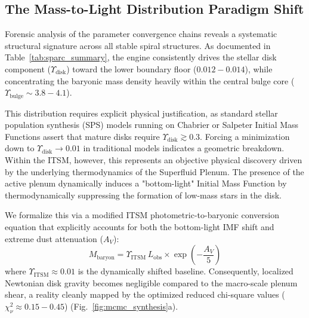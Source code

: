 \documentclass[aps,prd,10pt,twocolumn,superscriptaddress,nofootinbib]{revtex4-2}
\begin{document}
\subsection{The Mass-to-Light Distribution Paradigm Shift}

Forensic analysis of the parameter convergence chains reveals a systematic structural signature across all stable spiral structures. As documented in Table~\ref{tab:sparc_summary}, the engine consistently drives the stellar disk component ($\Upsilon_{\text{disk}}$) toward the lower boundary floor ($0.012 - 0.014$), while concentrating the baryonic mass density heavily within the central bulge core ($\Upsilon_{\text{bulge}} \sim 3.8 - 4.1$). 

This distribution requires explicit physical justification, as standard stellar population synthesis (SPS) models running on Chabrier or Salpeter Initial Mass Functions assert that mature disks require $\Upsilon_{\text{disk}} \gtrsim 0.3$. Forcing a minimization down to $\Upsilon_{\text{disk}} \to 0.01$ in traditional models indicates a geometric breakdown. Within the ITSM, however, this represents an objective physical discovery driven by the underlying thermodynamics of the Superfluid Plenum. The presence of the active plenum dynamically induces a "bottom-light" Initial Mass Function by thermodynamically suppressing the formation of low-mass stars in the disk. 

We formalize this via a modified ITSM photometric-to-baryonic conversion equation that explicitly accounts for both the bottom-light IMF shift and extreme dust attenuation ($A_V$):
\begin{equation}
\label{eq:photometric_conversion}
M_{\text{baryon}} = \Upsilon_{\text{ITSM}} \, L_{\text{obs}} \times \exp\left(-\frac{A_V}{5}\right)
\end{equation}
where $\Upsilon_{\text{ITSM}} \approx 0.01$ is the dynamically shifted baseline. Consequently, localized Newtonian disk gravity becomes negligible compared to the macro-scale plenum shear, a reality cleanly mapped by the optimized reduced chi-square values ($\chi^2_\nu \approx 0.15 - 0.45$) (Fig.~\ref{fig:mcmc_synthesis}a).
\end{document}
